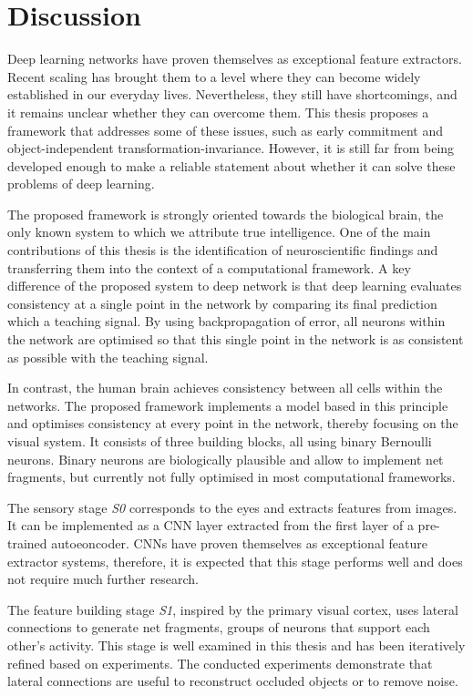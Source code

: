 \section{Discussion}
Deep learning networks have proven themselves as exceptional feature extractors.
Recent scaling has brought them to a level where they can become widely established in our everyday lives.
Nevertheless, they still have shortcomings, and it remains unclear whether they can overcome them.
This thesis proposes a framework that addresses some of these issues, such as early commitment and object-independent transformation-invariance.
However, it is still far from being developed enough to make a reliable statement about whether it can solve these problems of deep learning.

The proposed framework is strongly oriented towards the biological brain, the only known system to which we attribute true intelligence.
One of the main contributions of this thesis is the identification of neuroscientific findings and transferring them into the context of a computational framework.
A key difference of the proposed system to deep network is that deep learning evaluates consistency at a single point in the network by comparing its final prediction which a teaching signal.
By using backpropagation of error, all neurons within the network are optimised so that this single point in the network is as consistent as possible with the teaching signal.

In contrast, the human brain achieves consistency between all cells within the networks. 
The proposed framework implements a model based in this principle and optimises consistency at every point in the network, thereby focusing on the visual system.
It consists of three building blocks, all using binary Bernoulli neurons.
Binary neurons are biologically plausible and allow to implement net fragments, but currently not fully optimised in most computational frameworks.

The sensory stage \emph{S0} corresponds to the eyes and extracts features from images.
It can be implemented as a CNN layer extracted from the first layer of a pre-trained autoeoncoder. CNNs have proven themselves as exceptional feature extractor systems, therefore, it is expected that this stage performs well and does not require much further research.

The feature building stage \emph{S1}, inspired by the primary visual cortex, uses lateral connections to generate net fragments, groups of neurons that support each other's activity. 
This stage is well examined in this thesis and has been iteratively refined based on experiments.
The conducted experiments demonstrate that lateral connections are useful to reconstruct occluded objects or to remove noise.

